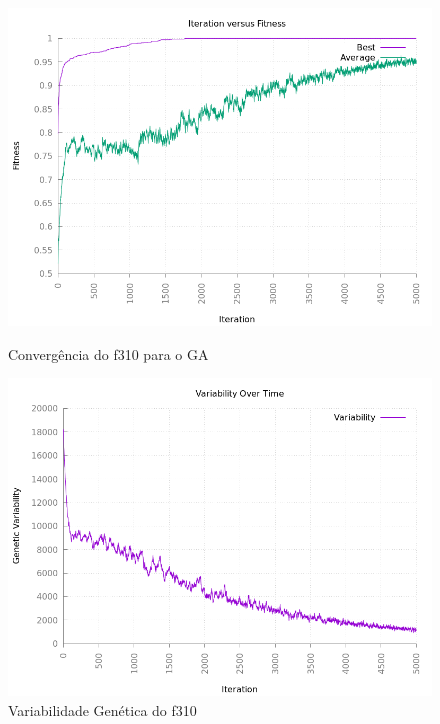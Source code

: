 \documentclass[12pt]{article}
\begin{document}
\begin{figure}[h!]
    \centering
    \begin{minipage}{0.45\textwidth}
        \centering
        \includegraphics[width=\textwidth]{pictures/f310convergence}
        \caption{Convergência do f310 para o GA}
        \label{f310}
    \end{minipage}
    \begin{minipage}{0.45\textwidth}
        \centering
        \includegraphics[width=\textwidth]{pictures/f310variability}
        \caption{Variabilidade Genética do f310}
    \end{minipage}
\end{figure}
\end{document}

